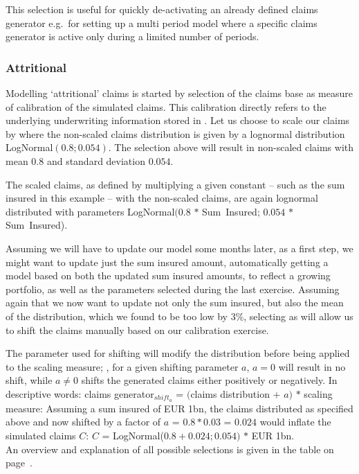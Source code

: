 This selection is useful for quickly de-activating an already defined claims generator e.g.~for setting up a multi period model where a specific claims generator is active only during a limited number of periods.

\subsubsection*{Attritional}

Modelling `attritional' claims is started by selection of the claims base as measure of calibration of the simulated claims. 
This calibration directly refers to the underlying underwriting information stored in . 
Let us choose to scale our claims by  where the non-scaled claims distribution is given by a lognormal distribution LogNormal$(0.8;0.054)$. 
The selection above will result in non-scaled claims with mean $0.8$ and standard deviation $0.054$.

The scaled claims, as defined by multiplying a given constant -- such as the sum insured in this example -- with the non-scaled claims, are again lognormal distributed with parameters LogNormal$(0.8$ $*$ Sum~Insured; $0.054$ $*$ Sum~Insured).

Assuming we will have to update our model some months later, as a first step, we might want to update
just the sum insured amount, automatically getting a model based on both the updated sum insured amounts,
to reflect a growing portfolio, as well as the parameters selected during the last exercise.
Assuming again that we now want to update not only the sum insured, but also the mean of the distribution,
which we found to be too low by 3\%, selecting  as  will allow us to
shift the claims manually based on our calibration exercise. 

The parameter used for shifting will modify
the distribution before being applied to the scaling measure; \ie, for a given shifting parameter $a$, $a=0$
will result in no shift, while $a \neq 0$ shifts the generated claims either positively or negatively.
In descriptive words: claims generator$_{shift_{a}}$ = $($claims distribution $+$ $a)$ $*$ scaling measure: Assuming a sum insured of EUR 1bn, the claims distributed as specified above and now shifted by a factor of
$a$ = $0.8*0.03$ = $0.024$ would inflate the simulated claims $C$: $C$ = LogNormal($0.8 + 0.024;0.054)$ $*$ EUR 1bn. \\
An overview and explanation of all possible selections is given in the table on page~\pageref{tab:ClaimsModelTypeDetail}.

